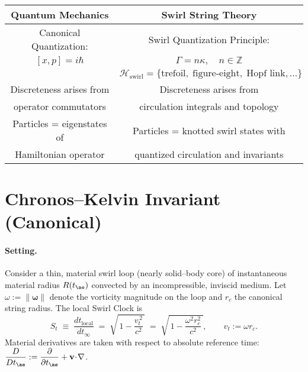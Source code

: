 \documentclass[11pt]{article}
\begin{document}
    \begin{center}
        \begin{tabular}{|c|c|}
            \hline
            \textbf{Quantum Mechanics} & \textbf{Swirl String Theory} \\
            \hline
            Canonical Quantization: & Swirl Quantization Principle: \\
            $[x, p] = i \hbar$ & $\Gamma = n \kappa, \quad n \in \mathbb{Z}$ \\[6pt]
            & $\mathcal{H}_\text{swirl} =
            \{ \text{trefoil}, \; \text{figure-eight}, \; \text{Hopf link}, \dots \}$ \\
            \hline
            Discreteness arises from & Discreteness arises from \\
            operator commutators & circulation integrals and topology \\
            \hline
            Particles = eigenstates of & Particles = knotted swirl states with \\
            Hamiltonian operator & quantized circulation and invariants \\
            \hline
        \end{tabular}
    \end{center}


    \section{Chronos–Kelvin Invariant (Canonical)}
    \label{sec:chronos_kelvin}

    \paragraph{Setting.}
    Consider a thin, material swirl loop (nearly solid–body core) of instantaneous material radius
    $R(t_{\ae})$ convected by an incompressible, inviscid medium. Let $\omega:=\|\boldsymbol{\omega}\|$ denote the
    vorticity magnitude on the loop and $r_c$ the canonical string radius. The local Swirl Clock is
    \begin{equation}
        S_t \;\equiv\; \frac{dt_{\text{local}}}{dt_\infty}
        \;=\;
        \sqrt{\,1-\frac{v_t^{\,2}}{c^2}\,}
        \;=\;
        \sqrt{\,1-\frac{\omega^2 r_c^2}{c^2}\,},\qquad v_t:=\omega r_c .
        \label{eq:SwirlClock-def}
    \end{equation}
    Material derivatives are taken with respect to absolute reference time:
    $\displaystyle \frac{D}{Dt_{\ae}}:=\frac{\partial}{\partial t_{\ae}}+\mathbf{v}\!\cdot\!\nabla$.
\end{document}
